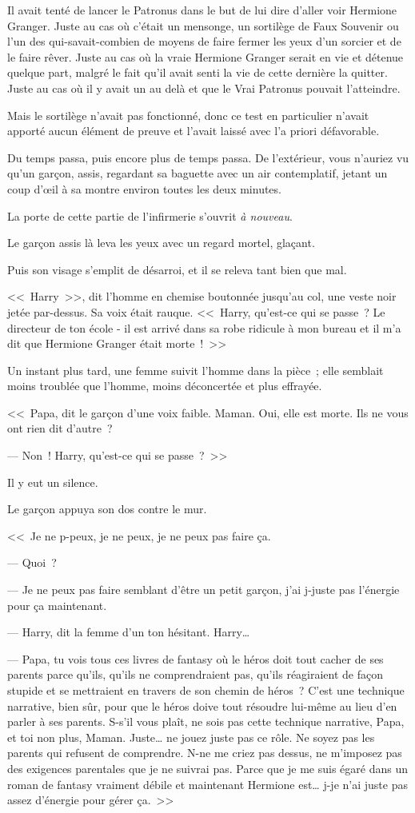 Il avait tenté de lancer le Patronus dans le but de lui dire d'aller voir Hermione Granger. Juste au cas où c'était un mensonge, un sortilège de Faux Souvenir ou l'un des qui-savait-combien de moyens de faire fermer les yeux d'un sorcier et de le faire rêver. Juste au cas où la vraie Hermione Granger serait en vie et détenue quelque part, malgré le fait qu'il avait senti la vie de cette dernière la quitter. Juste au cas où il y avait un au delà et que le Vrai Patronus pouvait l'atteindre.

Mais le sortilège n'avait pas fonctionné, donc ce test en particulier n'avait apporté aucun élément de preuve et l'avait laissé avec l'a priori défavorable.

Du temps passa, puis encore plus de temps passa. De l'extérieur, vous n'auriez vu qu'un garçon, assis, regardant sa baguette avec un air contemplatif, jetant un coup d'œil à sa montre environ toutes les deux minutes.

La porte de cette partie de l'infirmerie s'ouvrit \emph{à nouveau}.

Le garçon assis là leva les yeux avec un regard mortel, glaçant.

Puis son visage s'emplit de désarroi, et il se releva tant bien que mal.

<<~Harry~>>, dit l'homme en chemise boutonnée jusqu'au col, une veste noir jetée par-dessus. Sa voix était rauque. <<~Harry, qu'est-ce qui se passe~? Le directeur de ton école - il est arrivé dans sa robe ridicule à mon bureau et il m'a dit que Hermione Granger était morte~!~>>

Un instant plus tard, une femme suivit l'homme dans la pièce~; elle semblait moins troublée que l'homme, moins déconcertée et plus effrayée.

<<~Papa, dit le garçon d'une voix faible. Maman. Oui, elle est morte. Ils ne vous ont rien dit d'autre~?

--- Non~! Harry, qu'est-ce qui se passe~?~>>

Il y eut un silence.

Le garçon appuya son dos contre le mur.

<<~Je ne p-peux, je ne peux, je ne peux pas faire ça.

--- Quoi~?

--- Je ne peux pas faire semblant d'être un petit garçon, j'ai j-juste pas l'énergie pour ça maintenant.

--- Harry, dit la femme d'un ton hésitant. Harry…

--- Papa, tu vois tous ces livres de fantasy où le héros doit tout cacher de ses parents parce qu'ils, qu'ils ne comprendraient pas, qu'ils réagiraient de façon stupide et se mettraient en travers de son chemin de héros~? C'est une technique narrative, bien sûr, pour que le héros doive tout résoudre lui-même au lieu d'en parler à ses parents. S-s'il vous plaît, ne sois pas cette technique narrative, Papa, et toi non plus, Maman. Juste… ne jouez juste pas ce rôle. Ne soyez pas les parents qui refusent de comprendre. N-ne me criez pas dessus, ne m'imposez pas des exigences parentales que je ne suivrai pas. Parce que je me suis égaré dans un roman de fantasy vraiment débile et maintenant Hermione est… j-je n'ai juste pas assez d'énergie pour gérer ça.~>>

